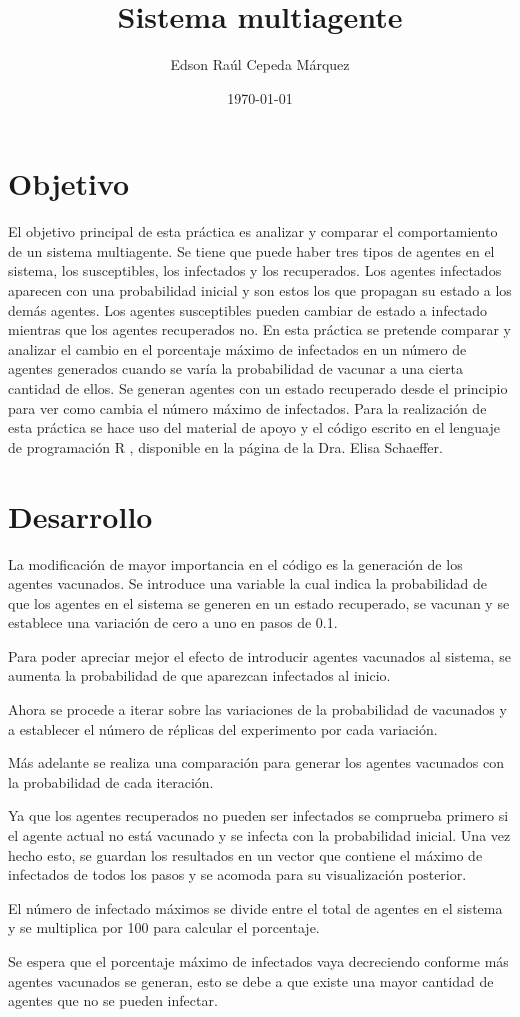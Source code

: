 \documentclass{article}
\author{Edson Raúl Cepeda Márquez}
\title{Sistema multiagente}
\date{\today}
\begin{document}
\maketitle

\section{Objetivo}
El objetivo principal de esta práctica es analizar y comparar el comportamiento de un sistema multiagente.
Se tiene que puede haber tres tipos de agentes en el sistema, los susceptibles, los infectados y los recuperados.
Los agentes infectados aparecen con una probabilidad inicial y son estos los que propagan su estado a los demás agentes.
Los agentes susceptibles pueden cambiar de estado a infectado mientras que los agentes recuperados no.
En esta práctica se pretende comparar y analizar el cambio en el porcentaje máximo de infectados en un número de agentes generados cuando se varía la probabilidad de vacunar a una cierta cantidad de ellos. Se generan agentes con un estado recuperado desde el principio para ver como cambia el número máximo de infectados.
Para la realización de esta práctica se hace uso del material de apoyo y el código escrito en el lenguaje de programación R \cite{r}, disponible en la página \cite{satu} de la Dra. Elisa Schaeffer.

\section{Desarrollo}
La modificación de mayor importancia en el código es la generación de los agentes vacunados.
Se introduce una variable la cual indica la probabilidad de que los agentes en el sistema se generen en un estado recuperado, se vacunan y se establece una variación de cero a uno en pasos de 0.1.

Para poder apreciar mejor el efecto de introducir agentes vacunados al sistema, se aumenta la probabilidad de que aparezcan infectados al inicio.

Ahora se procede a iterar sobre las variaciones de la probabilidad de vacunados y a establecer el número de réplicas del experimento por cada variación.

Más adelante se realiza una comparación para generar los agentes vacunados con la probabilidad de cada iteración.

Ya que los agentes recuperados no pueden ser infectados se comprueba primero si el agente actual no está vacunado y se infecta con la probabilidad inicial.
Una vez hecho esto, se guardan los resultados en un vector que contiene el máximo de infectados de todos los pasos y se acomoda para su visualización posterior.
 
El número de infectado máximos se divide entre el total de agentes en el sistema y se multiplica por 100 para calcular el porcentaje.

Se espera que el porcentaje máximo de infectados vaya decreciendo conforme más agentes vacunados se generan, esto se debe a que existe una mayor cantidad de agentes que no se pueden infectar.
\end{document}
